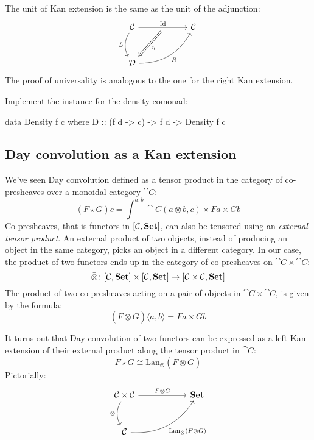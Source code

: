 \documentclass[DaoFP]{subfiles}
\begin{document}
The unit of Kan extension is the same as the unit of the adjunction:
\[
 \begin{tikzcd} [row sep=1cm, column sep=1cm]
 \cat C
 \arrow[rr, "\text{Id}", "" {name=ID, below} ]
 \arrow[d, bend right, "L"']
 && \cat C
 \\
 \cat D
  \arrow[urr, bend right, "R"']
 \arrow[Rightarrow, "\eta",  from=ID]
 \end{tikzcd}
\]
The proof of universality is analogous to the one for the right Kan extension.

\begin{exercise}
Implement the  instance for the density comonad:
\begin{haskell}
data Density f c where
   D :: (f d -> c) -> f d -> Density f c
\end{haskell}
\end{exercise}

\subsection{Day convolution as a Kan extension}

We've seen Day convolution defined as a tensor product in the category of co-presheaves over a monoidal category $\cat C$:
\[ (F \star G) c = \int^{a, b} \cat C (a \otimes b, c) \times F a \times G b \]
Co-presheaves, that is functors in $[\mathcal{C}, \mathbf{Set}]$, can also be tensored using an \emph{external tensor product}. An external product of two objects, instead of producing an object in the same category, picks an object in a different category. In our case, the product of two functors ends up in the category of co-presheaves on $\cat C \times \cat C$:
\[ \bar{\otimes} \colon [\mathcal{C}, \mathbf{Set}] \times [\mathcal{C}, \mathbf{Set}] \to [\mathcal{C} \times \mathcal{C}, \mathbf{Set}] \]
The product of two co-presheaves acting on a pair of objects in $\cat C \times \cat C$, is given by the formula:
\[ (F \bar{\otimes} G)\langle a, b \rangle = F a \times G b \]

It turns out that Day convolution of two functors can be expressed as a left Kan extension of their external product along the tensor product in $\cat C$:
\[ F \star G \cong \text{Lan}_{\otimes} (F \bar{ \otimes } G) \]
Pictorially:
\[
 \begin{tikzcd} [row sep=1cm, column sep=1cm]
 \cat C \times \cat C
 \arrow[rr, "F \bar{\otimes} G", "" {name=ID, below} ]
 \arrow[d, bend right, "\otimes"']
 && \Set
 \\
 \cat C
  \arrow[urr, bend right, "\text{Lan}_{\otimes} (F \bar{ \otimes } G)"']
 \end{tikzcd}
\]
\end{document}
